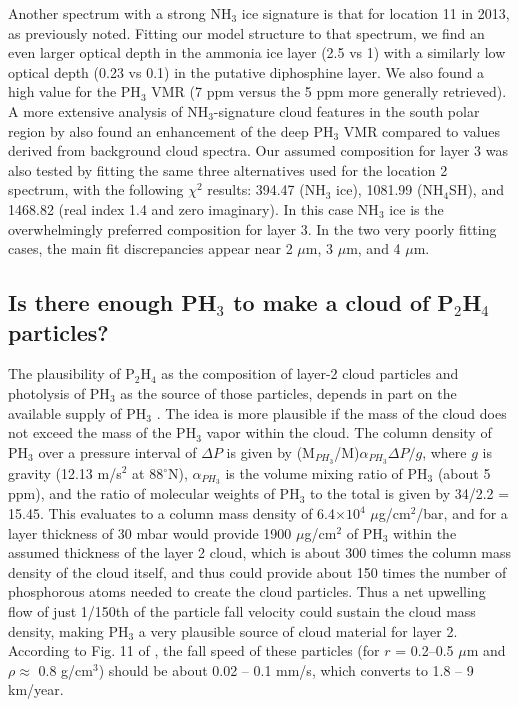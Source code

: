 \documentclass[article,11pt]{emulateapj}
\def\degx{$^\circ$}
\def\mum{$\mu$m }
\def\mumx{$\mu$m}
\def\chisq{$\chi^2$ }
\def\pht{PH$_3$ }
\def\pthf{P$_2$H$_4$ }
\def\nht{NH$_3$ }
\def\nhtx{NH$_3$}
\def\nhfshx{NH$_4$SH}
\begin{document}
Another spectrum
with a strong \nht ice signature is that for location 11 in 2013,
as previously noted. Fitting our model structure to that spectrum,
we find an even larger optical depth in the ammonia ice layer (2.5 vs 1)
with a similarly low optical depth (0.23 vs 0.1) in the putative diphosphine layer.
We also found a high value for the \pht VMR (7 ppm versus the 5 ppm more generally
retrieved). 
 A more extensive analysis of \nhtx-signature
cloud features in the south polar region by \cite{Sro2020spole} also found an
enhancement of the deep \pht VMR compared to values derived from
background cloud spectra.   Our assumed composition for layer 3 was also tested
by fitting the same three alternatives used for the location 2 spectrum,  with the following
\chisq results: 394.47 (\nht ice), 1081.99 (\nhfshx), and 1468.82
(real index 1.4 and zero imaginary). In this case \nht ice is the overwhelmingly preferred composition
for layer 3. In the two very poorly fitting cases, the main fit discrepancies appear near
2 \mumx, 3 \mumx, and 4 \mumx. 



\subsection{Is there enough \pht to make a cloud of \pthf particles?}

The plausibility of \pthf as the composition of layer-2 cloud particles
and photolysis of \pht as the source of those particles, depends
in part on the available supply of \pht. The idea is more plausible if the mass of the
cloud does not exceed the mass of the \pht vapor within the
cloud.  The column density of \pht over a pressure interval of
$\Delta P$ is given by (M$_{PH_3}$/M)$\alpha_{PH_3} \Delta P/g$, where
$g$ is gravity (12.13 m/s$^2$ at 88\degx N), $\alpha_{PH_3}$ is the
volume mixing ratio of \pht (about 5 ppm), and the ratio of molecular
weights of \pht to the total is given by 34/2.2 = 15.45.  This
evaluates to a column mass density of 6.4$\times 10^4$
$\mu$g/cm$^2$/bar, and for a layer thickness of 30 mbar would provide 1900
$\mu$g/cm$^2$ of \pht within the assumed thickness of the
layer 2 cloud, which is about 300 times the column mass density of the
cloud itself, and thus could provide about 150 times the number of
phosphorous atoms needed to create the cloud particles. Thus a net
upwelling flow of just 1/150th of the particle fall velocity could
sustain the cloud mass density, making \pht a very plausible source of
cloud material for layer 2. According to Fig. 11 of \cite{Roman2013}, the
fall speed of these particles (for $r$ = 0.2--0.5 \mum and $\rho \approx$ 0.8 g/cm$^3$)
should be about 0.02 -- 0.1 mm/s, which converts to 1.8 -- 9 km/year.
\end{document}
